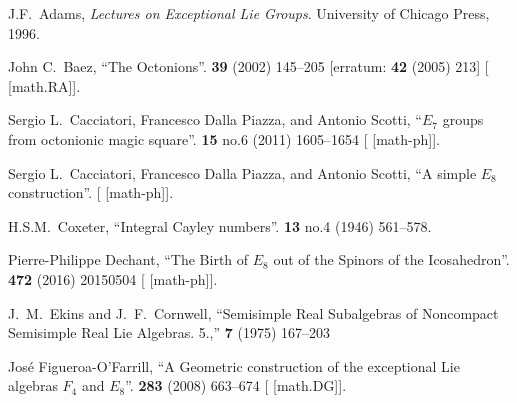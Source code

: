 \begin{thebibliography}{99}
\footnotesize%

J.F.\ Adams,
\textit{Lectures on Exceptional Lie Groups}.
University of Chicago Press, 1996.

John C.~Baez,
``The Octonions''.
 \textbf{39} (2002) 145--205
[erratum:  \textbf{42} (2005) 213]
{\tt{}}
[ [math.RA]].

Sergio L.~Cacciatori, Francesco Dalla Piazza, and Antonio Scotti,
``$E_7$ groups from octonionic magic square''.
 \textbf{15} no.6 (2011) 1605--1654
{\tt{}}
[ [math-ph]].

Sergio L.~Cacciatori, Francesco Dalla Piazza, and Antonio Scotti,
``A simple $E_8$ construction''.
[ [math-ph]].


H.S.M.~Coxeter,
``Integral Cayley numbers''.
 \textbf{13} no.4 (1946) 561--578.
{\tt{}}



Pierre-Philippe Dechant,
``The Birth of $E_8$ out of the Spinors of the Icosahedron''.
 \textbf{472} (2016) 20150504
{\tt{}}
[ [math-ph]].


J.~M.~Ekins and J.~F.~Cornwell,
``Semisimple Real Subalgebras of Noncompact Semisimple Real Lie Algebras. 5.,''
 \textbf{7} (1975) 167--203
{\tt{}}


Jos\'e Figueroa-O'Farrill,
``A Geometric construction of the exceptional Lie algebras $F_{4}$ and $E_{8}$''.
 \textbf{283} (2008) 663--674
{\tt{}}
[ [math.DG]].


\end{thebibliography}
